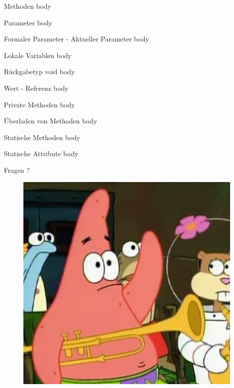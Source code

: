 \documentclass[18pt]{beamer}
\begin{document}
\begin{frame}{Methoden}
    body
\end{frame}

\begin{frame}{Parameter}
    body
\end{frame}

\begin{frame}{Formaler Parameter - Aktueller Parameter}
    body
\end{frame}

\begin{frame}{Lokale Variablen}
    body
\end{frame}

\begin{frame}{Rückgabetyp void}
    body
\end{frame}

\begin{frame}{Wert - Referenz}
    body
\end{frame}

\begin{frame}{Private Methoden}
    body
\end{frame}

\begin{frame}{Überladen von Methoden}
    body
\end{frame}

\begin{frame}{Statische Methoden}
    body
\end{frame}

\begin{frame}{Statische Attribute}
    body
\end{frame}

\appendix
\beginbackup

\begin{frame}{Fragen ?}
    \begin{figure}
        \includegraphics[scale=0.3]{img/fragen.jpg}
    \end{figure}
\end{frame}
\end{document}
